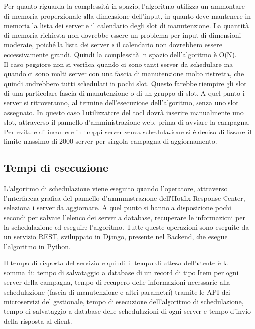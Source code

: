 Per quanto riguarda la complessità in spazio, l'algoritmo utilizza un 
ammontare di memoria proporzionale alla dimensione dell'input, in quanto deve 
mantenere in memoria la lista dei server e il calendario degli slot di 
manutenzione. La quantità di memoria richiesta non dovrebbe essere un 
problema per input di dimensioni moderate, poiché la lista dei server e 
il calendario non dovrebbero essere eccessivamente grandi. Quindi la 
complessità in spazio dell'algoritmo è O(N).\\

Il caso peggiore non si verifica quando ci sono tanti 
server da schedulare ma quando ci sono molti server con una fascia di 
manutenzione molto ristretta, che quindi andrebbero tutti schedulati in 
pochi slot. Questo farebbe riempire gli slot di una particolare fascia di 
manutenzione o di un gruppo di slot. A quel punto i server si ritroveranno, 
al termine dell’esecuzione dell’algoritmo, senza uno slot assegnato. 
In questo caso l’utilizzatore del tool dovrà inserire manualmente uno slot, 
attraverso il pannello d'amministrazione web, prima di avviare la campagna.\\

Per evitare di incorrere in troppi server senza schedulazione si è deciso di 
fissare il limite massimo di 2000 server per singola campagna di aggiornamento.


\subsection{Tempi di esecuzione}
L’algoritmo di schedulazione viene eseguito quando l'operatore, attraverso 
l’interfaccia grafica del pannello d'amministrazione dell’Hotfix Response Center, 
seleziona i server da aggiornare. 
A quel punto si hanno a disposizione pochi secondi per salvare 
l’elenco dei server a database, recuperare le informazioni per la schedulazione 
ed eseguire l’algoritmo.
Tutte queste operazioni sono eseguite da un servizio REST, sviluppato in Django, 
presente nel Backend, che esegue l'algoritmo in Python.

Il tempo di risposta del servizio e quindi il tempo di attesa dell’utente è 
la somma di: tempo di salvataggio a database di un record di tipo Item per 
ogni server della campagna, tempo di recupero delle informazioni necessarie 
alla schedulazione (fascia di manutenzione e altri parametri) tramite le API 
dei microservizi del gestionale, tempo di esecuzione dell'algoritmo di 
schedulazione, tempo di salvataggio a database delle schedulazioni di ogni 
server e tempo d'invio della risposta al client.


